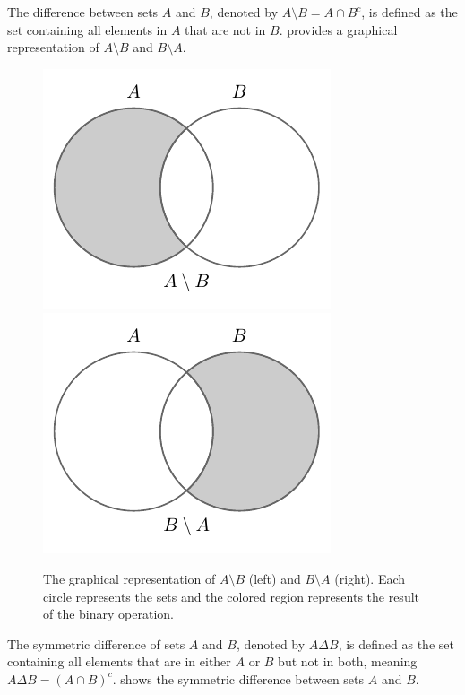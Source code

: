 \begin{definition}[Difference]
	The difference between sets $A$ and $B$, denoted by $A \setminus B = A\cap B^c$, is defined as the set containing all elements in $A$ that are not in $B$.  provides a graphical representation of $A\setminus B$ and $B\setminus A$.
	\begin{figure}[H]
		\centering
		\includegraphics[]{figures/set_minus.pdf}
		\includegraphics[]{figures/set_minus2.pdf}
		\caption{The graphical representation of $A\setminus B$ (left) and $B\setminus A$ (right). Each circle represents the sets and the colored region represents the result of the binary operation.}
		\label{fig:set_minus}
	\end{figure}
\end{definition}

\newpage
\begin{definition}
	The symmetric difference of sets $A$ and $B$, denoted by $A \Delta B$, is defined as the set containing all elements that are in either $A$ or $B$ but not in both, meaning $A \Delta B = (A \cap B)^c$.  shows the symmetric difference between sets $A$ and $B$.
\end{definition}



